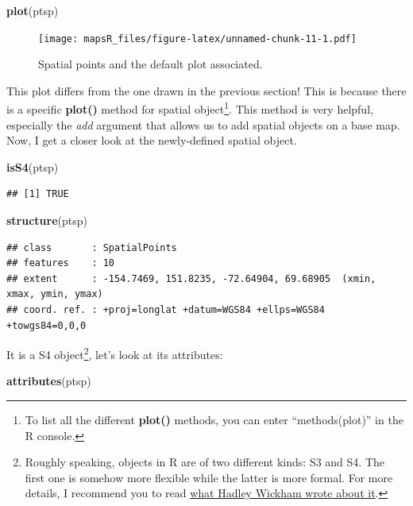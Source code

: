 \documentclass[]{report}
\newenvironment{Shaded}{\begin{snugshade}}{\end{snugshade}}
\newcommand{\KeywordTok}[1]{\textcolor[rgb]{0.13,0.29,0.53}{\textbf{#1}}}
\newcommand{\NormalTok}[1]{#1}
\let\rmarkdownfootnote\footnote%
\def\footnote{\protect\rmarkdownfootnote}
\begin{document}
\begin{Shaded}
\begin{Highlighting}[]
\KeywordTok{plot}\NormalTok{(ptsp)}
\end{Highlighting}
\end{Shaded}

\begin{figure}
\centering
\texttt{[image: mapsR\_files/figure-latex/unnamed-chunk-11-1.pdf]}
\caption{Spatial points and the default plot associated.}
\end{figure}

This plot differs from the one drawn in the previous section! This is
because there is a specific \textbf{plot()} method for spatial
object\footnote{To list all the different \textbf{plot()} methods, you
  can enter ``methods(plot)'' in the R console.}. This method is very
helpful, especially the \emph{add} argument that allows us to add
spatial objects on a base map. Now, I get a closer look at the
newly-defined spatial object.

\begin{Shaded}
\begin{Highlighting}[]
\KeywordTok{isS4}\NormalTok{(ptsp)}
\end{Highlighting}
\end{Shaded}

\begin{verbatim}
## [1] TRUE
\end{verbatim}

\begin{Shaded}
\begin{Highlighting}[]
\KeywordTok{structure}\NormalTok{(ptsp)}
\end{Highlighting}
\end{Shaded}

\begin{verbatim}
## class       : SpatialPoints 
## features    : 10 
## extent      : -154.7469, 151.8235, -72.64904, 69.68905  (xmin, xmax, ymin, ymax)
## coord. ref. : +proj=longlat +datum=WGS84 +ellps=WGS84 +towgs84=0,0,0
\end{verbatim}

It is a S4 object\footnote{Roughly speaking, objects in R are of two
  different kinds: S3 and S4. The first one is somehow more flexible
  while the latter is more formal. For more details, I recommend you to
  read \href{http://adv-r.had.co.nz/OO-essentials.html}{what Hadley
  Wickham wrote about it}.}, let's look at its attributes:

\begin{Shaded}
\begin{Highlighting}[]
\KeywordTok{attributes}\NormalTok{(ptsp)}
\end{Highlighting}
\end{Shaded}
\end{document}
